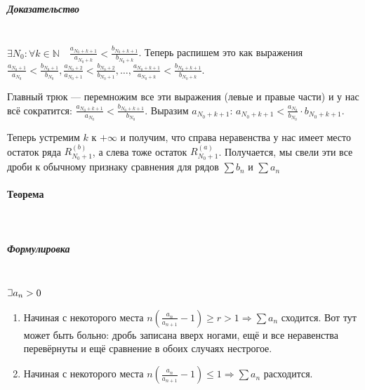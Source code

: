 \documentclass{article}
\def\letus{%
\mathord{\setbox0=\hbox{$\exists$}%
         \hbox{\kern 0.125\wd0%
               \vbox to \ht0{%
                  \hrule width 0.75\wd0%
                  \vfill%
                  \hrule width 0.75\wd0}%
               \vrule height \ht0%
               \kern 0.125\wd0}%
       }%
        }
\let\vanillaparagraph\paragraph
\let\vanillasubparagraph\subparagraph
\renewcommand{\paragraph}[1]{\vanillaparagraph{#1}\mbox{}\\}
\renewcommand{\subparagraph}[1]{\vanillasubparagraph{#1}\mbox{}\\}
\begin{document}
\subparagraph{Доказательство}
$\exists N_0 : \forall k \in \mathbb{N} \quad \frac{a_{N_0 + k + 1}}{a_{N_0 + k}} < \frac{b_{N_0 + k + 1}}{b_{N_0 + k}}$. Теперь распишем это как выражения $\frac{a_{N_0 + 1}}{a_{N_0}} < \frac{b_{N_0 + 1}}{b_{N_0}}, \frac{a_{N_0 + 2}}{a_{N_0 + 1}} < \frac{b_{N_0 + 2}}{b_{N_0 + 1}}, \ldots, \frac{a_{N_0 + k + 1}}{a_{N_0 + k}} < \frac{b_{N_0 + k + 1}}{b_{N_0 + k}}$. 
    
Главный трюк --- перемножим все эти выражения (левые и правые части) и у нас всё сократится: $\frac{a_{N_0+k+1}}{a_{N_0}} < \frac{b_{N_0+k+1}}{b_{N_0}}$. Выразим $a_{N_0 + k + 1}$: $a_{N_0 + k + 1} < \frac{a_{N_0}}{b_{N_0}} \cdot b_{N_0+k+1}$.
    
Теперь устремим $k$ к $+\infty$ и получим, что справа неравенства у нас имеет место остаток ряда $R^{(b)}_{N_0+1}$, а слева тоже остаток $R^{(a)}_{N_0+1}$. Получается, мы свели эти все дроби к обычному признаку сравнения для рядов $\sum b_n$ и $\sum a_n$

\paragraph{Теорема}
\subparagraph{Формулировка}
$\letus a_n > 0$
\begin{enumerate}
    \item Начиная с некоторого места $n(\frac{a_n}{a_{n+1}} - 1) \ge r > 1 \Rightarrow \sum a_n$ сходится. Вот тут может быть больно: дробь записана вверх ногами, ещё и все неравенства перевёрнуты и ещё сравнение в обоих случаях нестрогое.
    \item Начиная с некоторого места $n(\frac{a_n}{a_{n+1}} - 1) \le 1 \Rightarrow \sum a_n$ расходится. 
\end{enumerate}
\end{document}
